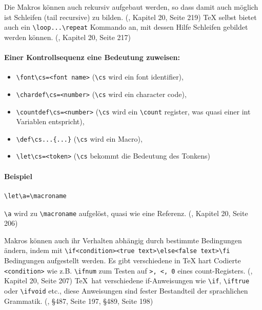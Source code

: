 Die Makros können auch rekursiv aufgebaut werden, so dass damit auch möglich ist
Schleifen (tail recursive) zu bilden.
(\cite{tex-a}, Kapitel 20, Seite 219)
TeX selbst bietet auch ein \lstinline|\loop...\repeat| Kommando an,
mit dessen Hilfe Schleifen gebildet werden können.
(\cite{tex-a}, Kapitel 20, Seite 217)


\paragraph{Einer Kontrollsequenz eine Bedeutung zuweisen:}

\begin{itemize}
  \item \lstinline|\font\cs=<font name>|
        (\lstinline|\cs| wird ein font identifier),
  \item \lstinline|\chardef\cs=<number>|
        (\lstinline|\cs| wird ein character code),
  \item \lstinline|\countdef\cs=<number>|
        (\lstinline|\cs| wird ein \lstinline|\count| register,
        was quasi einer int Variablen entspricht),
  \item \lstinline|\def\cs...{...}|
        (\lstinline|\cs| wird ein Macro),
  \item \lstinline|\let\cs=<token>|
        (\lstinline|\cs| bekommt die Bedeutung des Tonkens)
\end{itemize}

\paragraph{Beispiel}

\begin{verbatim}
\let\a=\macroname
\end{verbatim}

\lstinline|\a| wird zu \lstinline|\macroname| aufgelöst, quasi wie eine Referenz.
(\cite{tex-a}, Kapitel 20, Seite 206)


Makros können auch ihr Verhalten abhängig durch bestimmte Bedingungen
ändern, indem mit \lstinline|\if<condition><true text>\else<false text>\fi|
Bedingungen
aufgestellt werden. Es gibt verschiedene in TeX hart Codierte
\lstinline|<condition>|
wie z.B. \lstinline|\ifnum| zum Testen auf \lstinline|>, <, 0| eines count-Registers.
(\cite{tex-a}, Kapitel 20, Seite 207)
\TeX ~hat verschiedene if-Anweisungen wie \lstinline|\if|, \lstinline|\iftrue| oder \lstinline|\ifvoid| etc.,
diese Anweisungen sind fester Bestandteil der sprachlichen Grammatik.
(\cite{tex-a}, §487, Seite 197, §489, Seite 198)

